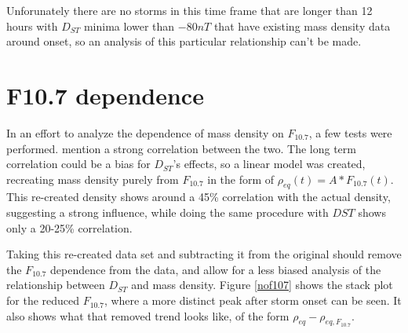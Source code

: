 \documentclass[10pt,twocolumn]{article}
\begin{document}
Unforunately there are no storms in this time frame that are longer than 12 hours with $D_{ST}$ minima lower than $-80nT$ that have existing mass density data around onset, so an analysis of this particular relationship can't be made.


\section{F10.7 dependence}
In an effort to analyze the dependence of mass density on $F_{10.7}$, a few tests were performed. \cite{Takahashi2010} mention a strong correlation between the two. The long term correlation could be a bias for $D_{ST}$'s effects, so a linear model was created, recreating mass density purely from $F_{10.7}$ in the form of $\rho_{eq}(t)=A*F_{10.7}(t)$. This re-created density shows around a 45\% correlation with the actual density, suggesting a strong influence, while doing the same procedure with $DST$ shows only a 20-25\% correlation. 

Taking this re-created data set and subtracting it from the original should remove the $F_{10.7}$ dependence from the data, and allow for a less biased analysis of the relationship between $D_{ST}$ and mass density. Figure \ref{nof107} shows the stack plot for the reduced $F_{10.7}$, where a more distinct peak after storm onset can be seen. It also shows what that removed trend looks like, of the form $\rho_{eq}-\rho_{eq,F_{10.7}}$.
\end{document}
